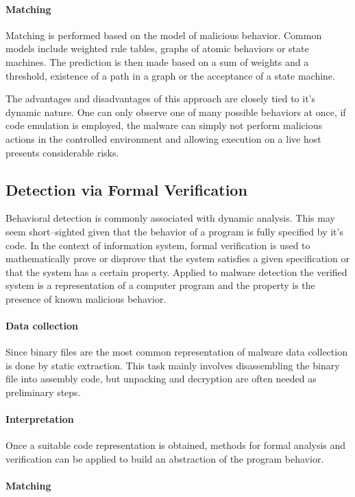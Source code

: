 \paragraph*{Matching} Matching is performed based on the model of malicious behavior. Common models include weighted rule tables, graphs of atomic behaviors or state machines. The prediction is then made based on a sum of weights and a threshold, existence of a path in a graph or the acceptance of a state machine.

The advantages and disadvantages of this approach are closely tied to it's dynamic nature. One can only observe one of many possible behaviors at once, if code emulation is employed, the malware can simply not perform malicious actions in the controlled environment and allowing execution on a live host presents considerable risks.

\subsection{Detection via Formal Verification}
Behavioral detection is commonly associated with dynamic analysis. This may seem short--sighted given that the behavior of a program is fully specified by it's code. In the context of information system, formal verification is used to mathematically prove or disprove that the system satisfies a given specification or that the system has a certain property. Applied to malware detection the verified system is a representation of a computer program and the property is the presence of known malicious behavior.

\paragraph*{Data collection} Since binary files are the most common representation of malware data collection is done by static extraction. This task mainly involves disassembling the binary file into assembly code, but unpacking and decryption are often needed as preliminary steps.

\paragraph*{Interpretation} Once a suitable code representation is obtained, methods for formal analysis and verification can be applied to build an abstraction of the program behavior.
\paragraph*{Matching}

